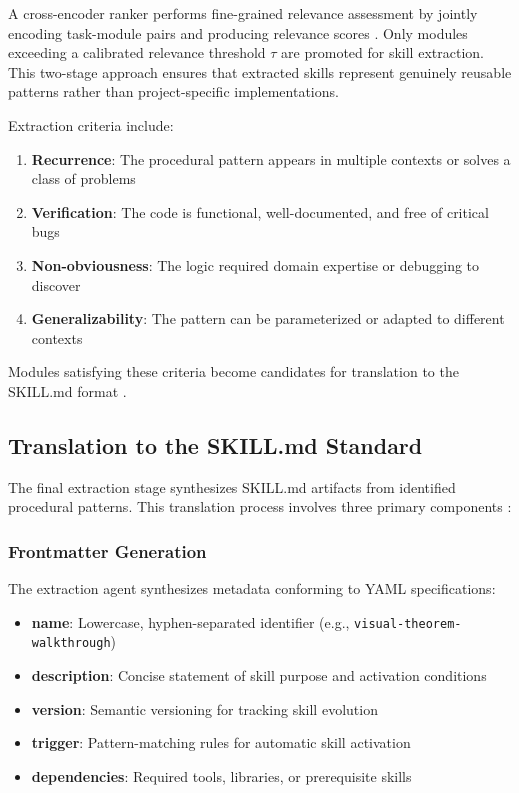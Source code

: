 \documentclass[11pt,a4paper]{article}
\begin{document}
A cross-encoder ranker performs fine-grained relevance assessment by jointly encoding task-module pairs and producing relevance scores \cite{ceur2024recskill}. Only modules exceeding a calibrated relevance threshold $\tau$ are promoted for skill extraction. This two-stage approach ensures that extracted skills represent genuinely reusable patterns rather than project-specific implementations.

Extraction criteria include:

\begin{enumerate}
\item \textbf{Recurrence}: The procedural pattern appears in multiple contexts or solves a class of problems
\item \textbf{Verification}: The code is functional, well-documented, and free of critical bugs
\item \textbf{Non-obviousness}: The logic required domain expertise or debugging to discover
\item \textbf{Generalizability}: The pattern can be parameterized or adapted to different contexts
\end{enumerate}

Modules satisfying these criteria become candidates for translation to the SKILL.md format \cite{lobehub2024selfimproving, llmbase2024selfimproving}.

\subsection{Translation to the SKILL.md Standard}

The final extraction stage synthesizes SKILL.md artifacts from identified procedural patterns. This translation process involves three primary components \cite{lobehub2024selfimproving, lobehub2024daoskills}:

\subsubsection{Frontmatter Generation}

The extraction agent synthesizes metadata conforming to YAML specifications:

\begin{itemize}
\item \textbf{name}: Lowercase, hyphen-separated identifier (e.g., \texttt{visual-theorem-walkthrough})
\item \textbf{description}: Concise statement of skill purpose and activation conditions
\item \textbf{version}: Semantic versioning for tracking skill evolution
\item \textbf{trigger}: Pattern-matching rules for automatic skill activation
\item \textbf{dependencies}: Required tools, libraries, or prerequisite skills
\end{itemize}
\end{document}

